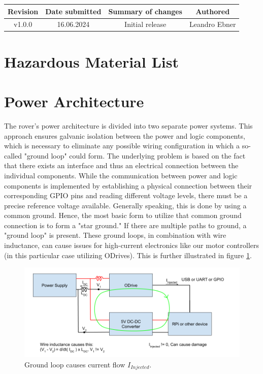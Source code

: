     \begin{table}[b]
        \centering
        \begin{tabular}{|c|c|c|c|} \hline 
             Revision&  Date submitted& Summary of changes  &Authored\\ \hline 
             v1.0.0&  16.06.2024& Initial release  &Leandro Ebner\\ \hline
        \end{tabular}
    \end{table}
    \clearpage

\section{Hazardous Material List}

    \clearpage
    
\section{Power Architecture}

    The rover's power architecture is divided into two separate power systems. This approach ensures galvanic isolation between the power and logic components, which is necessary to eliminate any possible wiring configuration in which a so-called "ground loop" could form. The underlying problem is based on the fact that there exists an interface and thus an electrical connection between the individual components. While the communication between power and logic components is implemented by establishing a physical connection between their corresponding GPIO pins and reading different voltage levels, there must be a precise reference voltage available. Generally speaking, this is done by using a common ground. Hence, the most basic form to utilize that common ground connection is to form a "star ground." If there are multiple paths to ground, a "ground loop" is present. These ground loops, in combination with wire inductance, can cause issues for high-current electronics like our motor controllers (in this particular case utilizing ODrives). This is further illustrated in figure \ref{ground_loop_bad}.
    
    \begin{figure}[h]
    \includegraphics[width=\textwidth]{contents/figures/ground_loop_bad.png}
    \caption{Ground loop causes current flow $I_{Injected}$.}
    \label{ground_loop_bad}
    \end{figure}
    
